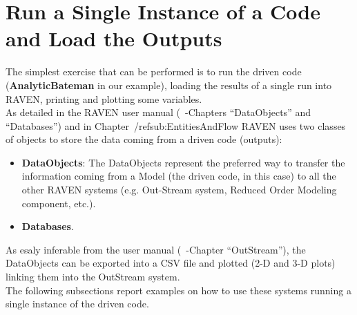 \section{Run a Single Instance of a Code and Load the Outputs}
The simplest exercise that can be performed is to run the driven code (\textbf{AnalyticBateman}  in our example), loading the results of a single run into RAVEN, printing and plotting some variables.
\\ As detailed in the RAVEN user manual (~\cite{RAVENuserManual}-Chapters ``DataObjects''  and ``Databases'') and in Chapter~/ref{sub:EntitiesAndFlow} RAVEN uses two classes of objects to store the data coming from a driven code (outputs):
\begin{itemize}
  \item \textbf{DataObjects}: The DataObjects represent the preferred way to transfer the information coming from a 
   Model (the driven code, in this case) to all the other RAVEN systems (e.g. Out-Stream system, Reduced Order Modeling
   component, etc.). 
  \item \textbf{Databases}.
\end{itemize}

As esaly inferable from the user manual (~\cite{RAVENuserManual}-Chapter ``OutStream''), the DataObjects can be exported into a CSV file and plotted (2-D and 3-D plots) linking them into the OutStream system.
\\ The following subsections report examples on how to use these systems running a single instance of the driven code.
